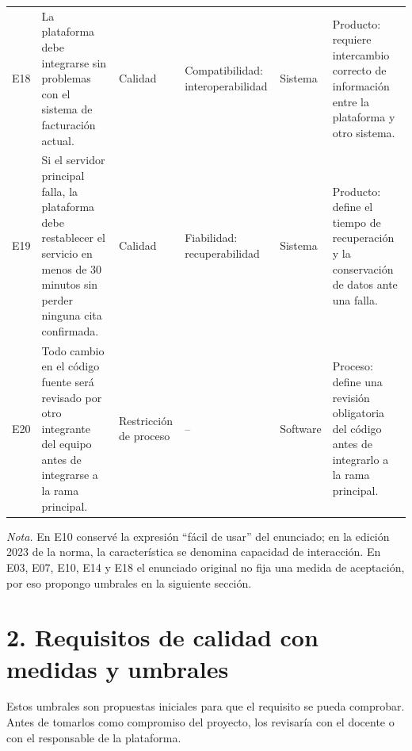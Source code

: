 \documentclass[10pt,letterpaper,landscape]{article}
\begin{document}
\begin{longtable}{@{}p{0.48in}p{2.25in}p{1.35in}p{1.48in}p{1.00in}p{2.95in}@{}}
E18 & La plataforma debe integrarse sin problemas con el sistema de facturación actual. & Calidad & Compatibilidad: interoperabilidad & Sistema & Producto: requiere intercambio correcto de información entre la plataforma y otro sistema. \\
E19 & Si el servidor principal falla, la plataforma debe restablecer el servicio en menos de 30 minutos sin perder ninguna cita confirmada. & Calidad & Fiabilidad: recuperabilidad & Sistema & Producto: define el tiempo de recuperación y la conservación de datos ante una falla. \\
E20 & Todo cambio en el código fuente será revisado por otro integrante del equipo antes de integrarse a la rama principal. & Restricción de proceso & -- & Software & Proceso: define una revisión obligatoria del código antes de integrarlo a la rama principal. \\
\end{longtable}
\normalsize

\textit{Nota.} En E10 conservé la expresión ``fácil de usar'' del enunciado; en la edición 2023 de la norma, la característica se denomina capacidad de interacción. En E03, E07, E10, E14 y E18 el enunciado original no fija una medida de aceptación, por eso propongo umbrales en la siguiente sección.

\section*{2. Requisitos de calidad con medidas y umbrales}

Estos umbrales son propuestas iniciales para que el requisito se pueda comprobar. Antes de tomarlos como compromiso del proyecto, los revisaría con el docente o con el responsable de la plataforma.
\end{document}
